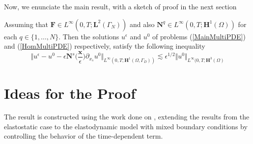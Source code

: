 

Now, we enunciate the main result, with a sketch of proof in the next section
\begin{theo}
Assuming that $\mathbf{F} \in L^{\infty}(0,T;\mathbf{L}^{2}(\Gamma_N))$ and also $\mathbf{N}^q \in L^{\infty}(0,T; \mathbf{H}^1(\Omega))$ for each $q \in \{1,\dots, N\}$. Then the solutions $u^{\epsilon}$ and $u^0$ of problems (\ref{MainMultiPDE}) and (\ref{HomMultiPDE}) respectively, satisfy the following inequality
\begin{equation*}
    \label{MainInequality}
    \Vert u^{\epsilon} - u^0 - \epsilon \mathbf{N}^s \big(\frac{\mathbf{x}}{\epsilon} \big) \partial_{x_s} u^0 \Vert_{L^{\infty}(0,T; \mathbf{H}^1(\Omega, \Gamma_D))} \lesssim \epsilon^{1/2} \Vert u^0 \Vert_{L^{\infty}(0,T; \mathbf{H}^{3}(\Omega)}
\end{equation*}
\end{theo}

\section{Ideas for the Proof}
The result is constructed using the work done on \cite{oleinik1992mathematical}, extending the results from the elastostatic case to the elastodynamic model with mixed boundary conditions by controlling the behavior of the time-dependent term.

